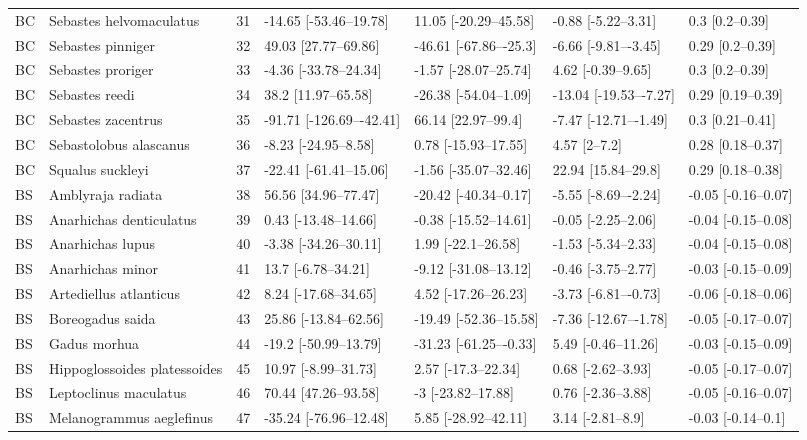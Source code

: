 \begin{longtable}[t]{lllllll}
\addlinespace
BC & Sebastes helvomaculatus & 31 & -14.65 [-53.46–19.78] & 11.05 [-20.29–45.58] & -0.88 [-5.22–3.31] & 0.3 [0.2–0.39]\\
BC & Sebastes pinniger & 32 & 49.03 [27.77–69.86] & -46.61 [-67.86–-25.3] & -6.66 [-9.81–-3.45] & 0.29 [0.2–0.39]\\
BC & Sebastes proriger & 33 & -4.36 [-33.78–24.34] & -1.57 [-28.07–25.74] & 4.62 [-0.39–9.65] & 0.3 [0.2–0.39]\\
BC & Sebastes reedi & 34 & 38.2 [11.97–65.58] & -26.38 [-54.04–1.09] & -13.04 [-19.53–-7.27] & 0.29 [0.19–0.39]\\
BC & Sebastes zacentrus & 35 & -91.71 [-126.69–-42.41] & 66.14 [22.97–99.4] & -7.47 [-12.71–-1.49] & 0.3 [0.21–0.41]\\
\addlinespace
BC & Sebastolobus alascanus & 36 & -8.23 [-24.95–8.58] & 0.78 [-15.93–17.55] & 4.57 [2–7.2] & 0.28 [0.18–0.37]\\
BC & Squalus suckleyi & 37 & -22.41 [-61.41–15.06] & -1.56 [-35.07–32.46] & 22.94 [15.84–29.8] & 0.29 [0.18–0.38]\\
BS & Amblyraja radiata & 38 & 56.56 [34.96–77.47] & -20.42 [-40.34–0.17] & -5.55 [-8.69–-2.24] & -0.05 [-0.16–0.07]\\
BS & Anarhichas denticulatus & 39 & 0.43 [-13.48–14.66] & -0.38 [-15.52–14.61] & -0.05 [-2.25–2.06] & -0.04 [-0.15–0.08]\\
BS & Anarhichas lupus & 40 & -3.38 [-34.26–30.11] & 1.99 [-22.1–26.58] & -1.53 [-5.34–2.33] & -0.04 [-0.15–0.08]\\
\addlinespace
BS & Anarhichas minor & 41 & 13.7 [-6.78–34.21] & -9.12 [-31.08–13.12] & -0.46 [-3.75–2.77] & -0.03 [-0.15–0.09]\\
BS & Artediellus atlanticus & 42 & 8.24 [-17.68–34.65] & 4.52 [-17.26–26.23] & -3.73 [-6.81–-0.73] & -0.06 [-0.18–0.06]\\
BS & Boreogadus saida & 43 & 25.86 [-13.84–62.56] & -19.49 [-52.36–15.58] & -7.36 [-12.67–-1.78] & -0.05 [-0.17–0.07]\\
BS & Gadus morhua & 44 & -19.2 [-50.99–13.79] & -31.23 [-61.25–-0.33] & 5.49 [-0.46–11.26] & -0.03 [-0.15–0.09]\\
BS & Hippoglossoides platessoides & 45 & 10.97 [-8.99–31.73] & 2.57 [-17.3–22.34] & 0.68 [-2.62–3.93] & -0.05 [-0.17–0.07]\\
\addlinespace
BS & Leptoclinus maculatus & 46 & 70.44 [47.26–93.58] & -3 [-23.82–17.88] & 0.76 [-2.36–3.88] & -0.05 [-0.16–0.07]\\
BS & Melanogrammus aeglefinus & 47 & -35.24 [-76.96–12.48] & 5.85 [-28.92–42.11] & 3.14 [-2.81–8.9] & -0.03 [-0.14–0.1]\\

\end{longtable}
